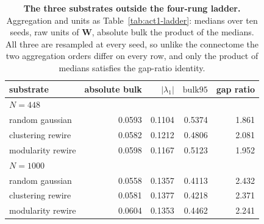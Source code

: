 \begin{table}[ht]
    \centering
    \caption[The three off-ladder substrates]{\textbf{The three substrates
    outside the four-rung ladder.} Aggregation and units as
    Table~\ref{tab:act1-ladder}: medians over ten seeds, raw units of $\mathbf{W}$,
    absolute bulk the product of the medians. All three are resampled at every
    seed, so unlike the connectome the two aggregation orders differ on every
    row, and only the product of medians satisfies the gap-ratio identity.}
    \label{tab:act1-offladder}
    \begin{tabular}{lrrrr}
        \toprule
        substrate & absolute bulk & $|\lambda_1|$ & $\mathrm{bulk95}$ & gap ratio \\
        \midrule
        \multicolumn{5}{l}{\emph{$N = 448$}} \\
        random gaussian & 0.0593 & 0.1104 & 0.5374 & 1.861 \\ %
        clustering rewire & 0.0582 & 0.1212 & 0.4806 & 2.081 \\ %
        modularity rewire & 0.0598  & 0.1167 & 0.5123 & 1.952 \\ %
        \midrule
        \multicolumn{5}{l}{\emph{$N = 1000$}} \\
        random gaussian & 0.0558 & 0.1357 & 0.4113 & 2.432 \\ %
        clustering rewire & 0.0581 & 0.1377 & 0.4218 & 2.371 \\ %
        modularity rewire & 0.0604 & 0.1353 & 0.4462 & 2.241 \\ %
        \bottomrule
    \end{tabular}
\end{table}

